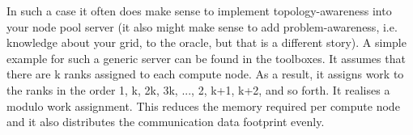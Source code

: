 In such a case it often does make sense to implement topology-awareness into your node pool server (it also might make sense to add problem-awareness, i.e. knowledge about your grid, to the oracle, but that is a different story). A simple example for such a generic server can be found in the toolboxes. It assumes that there are k ranks assigned to each compute node. As a result, it assigns work to the ranks in the order 1, k, 2k, 3k, ..., 2, k+1, k+2, and so forth. It realises a modulo work assignment. This reduces the memory required per compute node and it also distributes the communication data footprint evenly.   